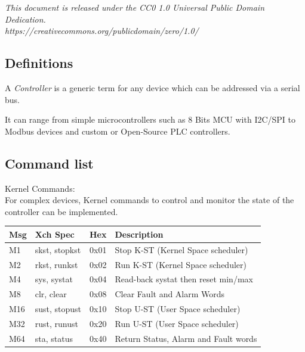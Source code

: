 \documentclass[12pt]{article}
\begin{document}
	
	\vspace{2em}
	{\small\textit{This document is released under the CC0 1.0 Universal Public Domain Dedication.\\
  	https://creativecommons.org/publicdomain/zero/1.0/}}

	\subsection*{Definitions}
	
	A \emph{Controller} is a generic term for any device which can be addressed via a serial bus.
	
	It can range from simple microcontrollers such as 8 Bits MCU with I2C/SPI to Modbus devices and custom or Open-Source PLC controllers.

	\subsection*{Command list}

	Kernel Commands:\\

	For complex devices, Kernel commands to control and monitor the state of the controller
	can be implemented.\\

\begin{tabular}{ | m{2.5em} | m{7em}| m{2.5em} | m{17em} | } 
	\hline
	Msg & Xch Spec & Hex & Description \\ 
	\hline
	M1 & skst, stopkst & 0x01 & Stop K-ST (Kernel Space scheduler) \\ 
	\hline
	M2 & rkst, runkst & 0x02 & Run K-ST (Kernel Space scheduler) \\
	\hline
	M4 & sys, systat & 0x04 & Read-back systat then reset min/max \\
	\hline
	M8 & clr, clear & 0x08 & Clear Fault and Alarm Words \\
	\hline
	M16 & sust, stopust & 0x10 & Stop U-ST (User Space scheduler) \\
	\hline
	M32 & rust, runust & 0x20 & Run U-ST (User Space scheduler) \\
	\hline
	M64 & sta, status & 0x40 & Return Status, Alarm and Fault words \\
	\hline
\end{tabular}
\end{document}
